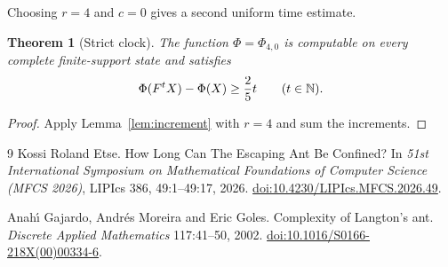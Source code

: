 \documentclass[11pt,a4paper]{article}
\newtheorem{theorem}{Theorem}[section]
\theoremstyle{remark}\newtheorem{remark}[theorem]{Remark}
\begin{document}
Choosing $r=4$ and $c=0$ gives a second uniform time estimate.

\begin{theorem}[Strict clock]\label{thm:clock}
The function $\Phi=\Phi_{4,0}$ is computable on every complete finite-support
state and satisfies
\begin{equation}\label{eq:time}
 \Phi(F^tX)-\Phi(X)\ge\frac25t\qquad(t\in\mathbb N).
\end{equation}
\end{theorem}
\begin{proof}
Apply Lemma~\ref{lem:increment} with $r=4$ and sum the increments.
\end{proof}


\begin{thebibliography}{9}
Kossi Roland Etse.
\newblock How Long Can The Escaping Ant Be Confined?
\newblock In \emph{51st International Symposium on Mathematical Foundations of
Computer Science (MFCS 2026)}, LIPIcs 386, 49:1--49:17, 2026.
\newblock \href{https://doi.org/10.4230/LIPIcs.MFCS.2026.49}{doi:10.4230/LIPIcs.MFCS.2026.49}.

Anah\'{\i} Gajardo, Andr\'{e}s Moreira and Eric Goles.
\newblock Complexity of Langton's ant.
\newblock \emph{Discrete Applied Mathematics} 117:41--50, 2002.
\newblock \href{https://doi.org/10.1016/S0166-218X(00)00334-6}{doi:10.1016/S0166-218X(00)00334-6}.
\end{thebibliography}
\end{document}
